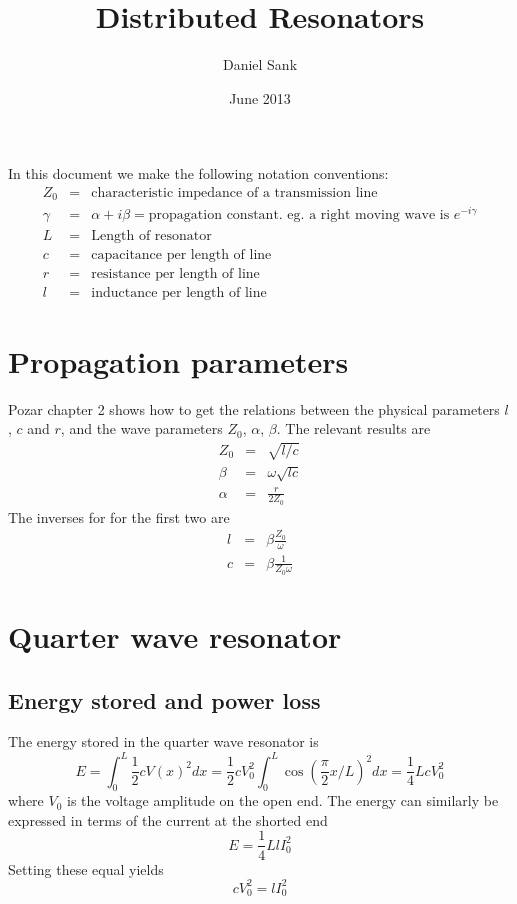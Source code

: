 \documentclass{article}
\title{Distributed Resonators}
\author{Daniel Sank}
\date{June 2013}
\begin{document}
\maketitle

In this document we make the following notation conventions: \begin{eqnarray*}
Z_0 &=& \textrm{characteristic impedance of a transmission line} \\
\gamma &=& \alpha+i\beta = \textrm{propagation constant. eg. a right moving wave is } e^{-i\gamma} \\
L &=& \textrm{Length of resonator} \\
c &=& \textrm{capacitance per length of line} \\
r &=& \textrm{resistance per length of line} \\
l &=& \textrm{inductance per length of line} \end{eqnarray*}

\section{Propagation parameters}

Pozar chapter 2 shows how to get the relations between the physical parameters $l$, $c$ and $r$, and the wave parameters $Z_0$, $\alpha$, $\beta$. The relevant results are \begin{eqnarray*}
Z_0 &=& \sqrt{l/c} \\
\beta &=& \omega \sqrt{lc} \\
\alpha &=& \frac{r}{2Z_0} \end{eqnarray*}
The inverses for for the first two are \begin{eqnarray*}
l &=& \beta \frac{Z_0}{\omega} \\
c &=& \beta \frac{1}{Z_0 \omega} \end{eqnarray*}

\section{Quarter wave resonator}

\subsection{Energy stored and power loss}

The energy stored in the quarter wave resonator is \begin{equation}
E = \int_0^L \frac{1}{2} c V(x)^2 dx = \frac{1}{2}cV_0^2\int_0^L \cos\left( \frac{\pi}{2}x/L \right)^2 dx =  \frac{1}{4}Lc V_0^2 \end{equation}
where $V_0$ is the voltage amplitude on the open end. The energy can similarly be expressed in terms of the current at the shorted end \begin{equation}
E = \frac{1}{4}LlI_0^2 \end{equation}
Setting these equal yields \begin{equation}
cV_0^2 = lI_0^2 \end{equation}
\end{document}
